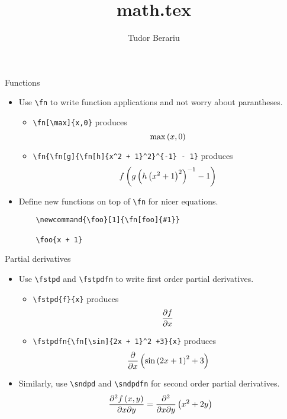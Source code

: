 \documentclass{beamer}
\title{math.tex}
\author{Tudor Berariu}
\begin{document}
    \begin{frame}[fragile]{Functions}
        \begin{itemize}
            \item Use \verb!\fn! to write \alert{function applications} and not worry about parantheses.
            \begin{itemize}
                \item \verb!\fn[\max]{x,0}! produces $$\fn[\max]{x, 0}$$
                \item \verb!\fn{\fn[g]{\fn[h]{x^2 + 1}^2}^{-1} - 1}! produces
                  $$\fn[f]{\fn[g]{\fn[h]{x^2 + 1}^2}^{-1} - 1}$$
                \end{itemize}
            \item Define new functions on top of \verb!\fn! for nicer equations.
        \begin{verbatim}
    \newcommand{\foo}[1]{\fn[foo]{#1}}

    \foo{x + 1}
            \end{verbatim}
        \end{itemize}
    \end{frame}
    
    \begin{frame}[fragile]{Partial derivatives}
        \begin{itemize}
            \item Use \verb!\fstpd! and \verb!\fstpdfn! to write \alert{first order partial derivatives}.
                \begin{itemize}
                    \item \verb!\fstpd{f}{x}! produces $$\fstpd{f}{x}$$
                    \item \verb!\fstpdfn{\fn[\sin]{2x + 1}^2 +3}{x}! produces
                     $$\fstpdfn{\fn[\sin]{2x + 1}^2 +3}{x}$$
                \end{itemize}
            \item Similarly, use \verb!\sndpd! and \verb!\sndpdfn! for
             \alert{second order partial derivatives}.
                $$\sndpd{\fn{x, y}}{x}{y} = \sndpdfn{x^2 + 2y}{x}{y}$$
        \end{itemize}        
    \end{frame}
\end{document}
